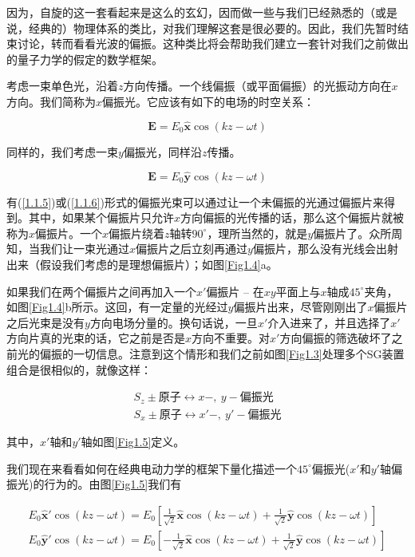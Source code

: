 \documentclass[UTF8,twoside]{ctexart}
\begin{document}
\noindent 因为，自旋的这一套看起来是这么的玄幻，因而做一些与我们已经熟悉的（或是说，经典的）物理体系的类比，对我们理解这套是很必要的。因此，我们先暂时结束讨论，转而看看光波的偏振。这种类比将会帮助我们建立一套针对我们之前做出的量子力学的假定的数学框架。

考虑一束单色光，沿着$z$方向传播。一个线偏振（或平面偏振）的光振动方向在$x$方向。我们简称为$x$偏振光。它应该有如下的电场的时空关系：

\begin{equation} \label{1.1.5}
\bm E = E_0 \hat{\bm x} \cos (kz - \omega t)
\end{equation}

\noindent 同样的，我们考虑一束$y$偏振光，同样沿$z$传播。

\begin{equation} \label{1.1.6}
\bm E = E_0 \hat{\bm y} \cos (kz - \omega t)
\end{equation}

\noindent 有(\ref{1.1.5})或(\ref{1.1.6})形式的偏振光束可以通过让一个未偏振的光通过偏振片来得到。其中，如果某个偏振片只允许$x$方向偏振的光传播的话，那么这个偏振片就被称为$x$偏振片。一个$x$偏振片绕着$z$轴转$90^{\circ}$，理所当然的，就是$y$偏振片了。众所周知，当我们让一束光通过$x$偏振片之后立刻再通过$y$偏振片，那么没有光线会出射出来（假设我们考虑的是理想偏振片）；如图\ref{Fig1.4}a。

如果我们在两个偏振片之间再加入一个$x'$偏振片 -- 在$xy$平面上与$x$轴成$45^{\circ}$夹角，如图\ref{Fig1.4}b所示。这回，有一定量的光经过$y$偏振片出来，尽管刚刚出了$x$偏振片之后光束是没有$y$方向电场分量的。换句话说，一旦$x'$介入进来了，并且选择了$x'$方向片真的光束的话，它之前是否是$x$方向不重要。对$x'$方向偏振的筛选破坏了之前光的偏振的一切信息。注意到这个情形和我们之前如图{\ref{Fig1.3}}处理多个SG装置组合是很相似的，就像这样：

\begin{equation} \label{1.1.7}
\begin{split}
S_z \pm \text{原子} \leftrightarrow x-,\ y-\text{偏振光}\\
S_x \pm \text{原子} \leftrightarrow x'-,\ y'-\text{偏振光}
\end{split}
\end{equation}

\noindent 其中，$x'$轴和$y'$轴如图{\ref{Fig1.5}}定义。

我们现在来看看如何在经典电动力学的框架下量化描述一个$45^{\circ}$偏振光($x'$和$y'$轴偏振光)的行为的。由图{\ref{Fig1.5}}我们有

\begin{equation} \label{1.1.8}
\begin{split}
E_0\bm{\hat{x}}'\cos(kz-\omega t) = E_0\left[\frac{1}{\sqrt{2}}\bm{\hat{x}}\cos(kz-\omega t) + \frac{1}{\sqrt{2}}\bm{\hat{y}}\cos(kz-\omega t)\right]\\
E_0\bm{\hat{y}}'\cos(kz-\omega t) = E_0\left[-\frac{1}{\sqrt{2}}\bm{\hat{x}}\cos(kz-\omega t) + \frac{1}{\sqrt{2}}\bm{\hat{y}}\cos(kz-\omega t)\right]
\end{split}
\end{equation}
\end{document}
